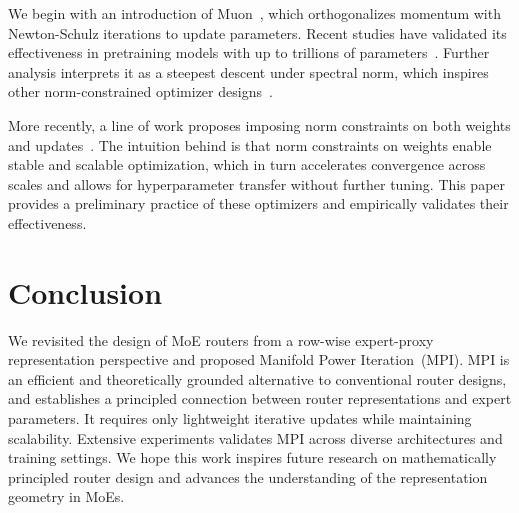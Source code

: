\documentclass{llmxive}
\providecommand{\Name}{Manifold Power Iteration}
\begin{document}
We begin with an introduction of Muon~\cite{muon}, which orthogonalizes momentum with Newton-Schulz iterations to update parameters.
Recent studies have validated its effectiveness in pretraining models with up to trillions of parameters~\cite{k2, deepseekv4}.
Further analysis interprets it as a steepest descent under spectral norm, which inspires other norm-constrained optimizer designs~\cite{scion}.

More recently, a line of work proposes imposing norm constraints on both weights and updates~\cite{hyperball, sso}.
The intuition behind is that norm constraints on weights enable stable and scalable optimization, which in turn accelerates convergence across scales and allows for hyperparameter transfer without further tuning.
This paper provides a preliminary practice of these optimizers and empirically validates their effectiveness.

\section{Conclusion}
We revisited the design of MoE routers from a row-wise expert-proxy representation perspective and proposed \Name\ (MPI).
MPI is an efficient and theoretically grounded alternative to conventional router designs, and establishes a principled connection between router representations and expert parameters.
It requires only lightweight iterative updates while maintaining scalability.
Extensive experiments validates MPI across diverse architectures and training settings.
We hope this work inspires future research on mathematically principled router design and advances the understanding of the representation geometry in MoEs.



\end{document}

